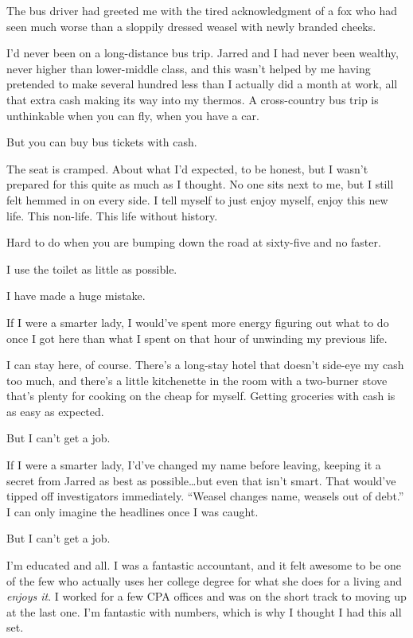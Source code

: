 The bus driver had greeted me with the tired acknowledgment of a fox who had seen much worse than a sloppily dressed weasel with newly branded cheeks.

I'd never been on a long-distance bus trip. Jarred and I had never been wealthy, never higher than lower-middle class, and this wasn't helped by me having pretended to make several hundred less than I actually did a month at work, all that extra cash making its way into my thermos. A cross-country bus trip is unthinkable when you can fly, when you have a car.

But you can buy bus tickets with cash.

The seat is cramped. About what I'd expected, to be honest, but I wasn't prepared for this quite as much as I thought. No one sits next to me, but I still felt hemmed in on every side. I tell myself to just enjoy myself, enjoy this new life. This non-life. This life without history.

Hard to do when you are bumping down the road at sixty-five and no faster.

I use the toilet as little as possible.

\secdiv{}

\noindent I have made a huge mistake.

If I were a smarter lady, I would've spent more energy figuring out what to do once I got here than what I spent on that hour of unwinding my previous life.

I can stay here, of course. There's a long-stay hotel that doesn't side-eye my cash too much, and there's a little kitchenette in the room with a two-burner stove that's plenty for cooking on the cheap for myself. Getting groceries with cash is as easy as expected.

But I can't get a job.

If I were a smarter lady, I'd've changed my name before leaving, keeping it a secret from Jarred as best as possible\ldots{}but even that isn't smart. That would've tipped off investigators immediately. ``Weasel changes name, weasels out of debt.'' I can only imagine the headlines once I was caught.

But I can't get a job.

I'm educated and all. I was a fantastic accountant, and it felt awesome to be one of the few who actually uses her college degree for what she does for a living and \emph{enjoys it}. I worked for a few CPA offices and was on the short track to moving up at the last one. I'm fantastic with numbers, which is why I thought I had this all set.

